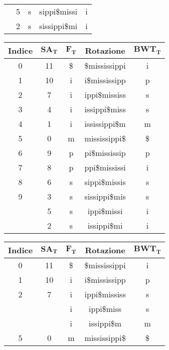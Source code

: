 \begin{esempio}
\begin{table}[H]
\begin{tabular}{c|c|c|c|c}
      {\color{nordred}{10}} & 5 & s & {\color{nordred}{s}}sippi\$missi & i\\
      {\color{nordred}{11}} & 2 & s & {\color{nordred}{s}}sissippi\$mi & i\\
    \end{tabular}
    \quad
    \begin{tabular}{c|c|c|c|c} 
      \textbf{Indice} & $\mathbf{SA_T}$ & $\mathbf{F_T}$ & \textbf{Rotazione}
      & $\mathbf{BWT_T}$\\ 
      \hline
      0 & 11 & \$ & \$mississippi & i\\
      1 & 10 & i & i\$mississipp & p\\
      2 & 7 & i & ippi\$mississ & s\\
      3 & 4 & i & issippi\$miss & s\\
      4 & 1 & i & ississippi\$m & m\\
      5 & 0 & m & mississippi\$ & \$\\
      6 & 9 & p & pi\$mississip & p\\
      7 & 8 & p & ppi\$mississi & i\\
      8 & 6 & s & sippi\$missis & s\\
      9 & 3 & s & sissippi\$mis & s\\
      {\color{nordred}{10}} & 5 & s & {\color{nordred}{ss}}ippi\$missi & i\\
      {\color{nordred}{11}} & 2 & s & {\color{nordred}{ss}}issippi\$mi & i\\
    \end{tabular}
  \end{table}
  \begin{table}[H]
    \centering
    \footnotesize
    \begin{tabular}{c|c|c|c|c} 
      \textbf{Indice} & $\mathbf{SA_T}$ & $\mathbf{F_T}$ & \textbf{Rotazione}
      & $\mathbf{BWT_T}$\\ 
      \hline
      0 & 11 & \$ & \$mississippi & i\\
      1 & 10 & i & i\$mississipp & p\\
      2 & 7 & i & ippi\$mississ & s\\
      {\color{nordred}{3}} & {\color{nordgreen}{4}} & i
                           & {\color{nordred}{iss}}ippi\$miss & s\\
      {\color{nordred}{4}} & {\color{nordgreen}{1}} & i
                           & {\color{nordred}{iss}}issippi\$m & m\\
      5 & 0 & m & mississippi\$ & \$\\

\end{tabular}
\end{table}
\end{esempio}
